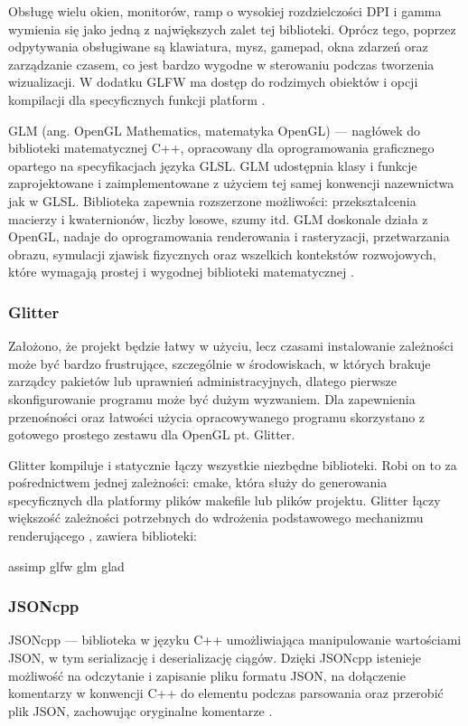 Obsługę wielu okien, monitorów, ramp o wysokiej rozdzielczości DPI i gamma wymienia się jako jedną z największych zalet tej biblioteki. Oprócz tego, poprzez odpytywania obsługiwane są klawiatura, mysz, gamepad, okna zdarzeń oraz zarządzanie czasem, co jest bardzo wygodne w sterowaniu podczas tworzenia wizualizacji. W dodatku GLFW ma dostęp do rodzimych obiektów i opcji kompilacji dla specyficznych funkcji platform \cite{glfw}.

GLM (ang. OpenGL Mathematics, matematyka OpenGL) --- nagłówek do biblioteki matematycznej C++, opracowany dla oprogramowania graficznego opartego na specyfikacjach języka GLSL. GLM udostępnia klasy i funkcje zaprojektowane i zaimplementowane z użyciem tej samej konwencji nazewnictwa jak w GLSL. Biblioteka zapewnia rozszerzone możliwości: przekształcenia macierzy i kwaternionów, liczby losowe, szumy itd. GLM doskonale działa z OpenGL, nadaje do oprogramowania renderowania i rasteryzacji, przetwarzania obrazu, symulacji zjawisk fizycznych oraz wszelkich kontekstów rozwojowych, które wymagają prostej i wygodnej biblioteki matematycznej \cite{glm}.

\subsubsection{Glitter}
Założono, że projekt będzie łatwy w użyciu, lecz czasami instalowanie zależności może być bardzo frustrujące, szczególnie w środowiskach, w których brakuje zarządcy pakietów lub uprawnień administracyjnych, dlatego pierwsze skonfigurowanie programu może być dużym wyzwaniem. Dla zapewnienia przenośności oraz łatwości użycia opracowywanego programu skorzystano z gotowego prostego zestawu dla OpenGL pt. Glitter.

Glitter kompiluje i statycznie łączy wszystkie niezbędne biblioteki. Robi on to za pośrednictwem jednej zależności: cmake, która służy do generowania specyficznych dla platformy plików makefile lub plików projektu. Glitter łączy większość zależności potrzebnych do wdrożenia podstawowego mechanizmu renderującego \cite{glitter}, zawiera biblioteki:
\begin{itemize}
\itemi assimp
\itemi glfw
\itemi glm
\itemi glad
\end{itemize}

\subsubsection{JSONcpp}
JSONcpp --- biblioteka w języku C++ umożliwiająca manipulowanie wartościami JSON, w tym serializację i deserializację ciągów. Dzięki JSONcpp istenieje możliwość na odczytanie i zapisanie pliku formatu JSON, na dołączenie komentarzy w konwencji C++ do elementu podczas parsowania oraz przerobić plik JSON, zachowując oryginalne komentarze \cite{jsoncpp}.

